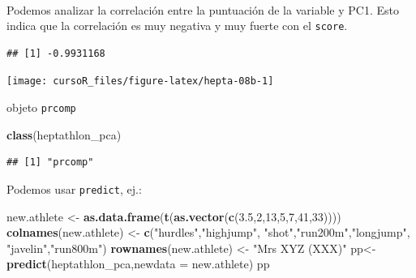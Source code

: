 \documentclass[]{book}
\newenvironment{Shaded}{\begin{snugshade}}{\end{snugshade}}
\newcommand{\KeywordTok}[1]{\textcolor[rgb]{0.13,0.29,0.53}{\textbf{#1}}}
\newcommand{\DataTypeTok}[1]{\textcolor[rgb]{0.13,0.29,0.53}{#1}}
\newcommand{\DecValTok}[1]{\textcolor[rgb]{0.00,0.00,0.81}{#1}}
\newcommand{\FloatTok}[1]{\textcolor[rgb]{0.00,0.00,0.81}{#1}}
\newcommand{\StringTok}[1]{\textcolor[rgb]{0.31,0.60,0.02}{#1}}
\newcommand{\OperatorTok}[1]{\textcolor[rgb]{0.81,0.36,0.00}{\textbf{#1}}}
\newcommand{\NormalTok}[1]{#1}
\begin{document}
~

Podemos analizar la correlación entre la puntuación de la variable y
PC1. Esto indica que la correlación es muy negativa y muy fuerte con el
\texttt{score}.

\begin{Shaded}
\end{Shaded}

\begin{verbatim}
## [1] -0.9931168
\end{verbatim}

\begin{Shaded}
\end{Shaded}

\begin{center}\texttt{[image: cursoR\_files/figure-latex/hepta-08b-1]} \end{center}

objeto \texttt{prcomp}

\begin{Shaded}
\begin{Highlighting}[]
\KeywordTok{class}\NormalTok{(heptathlon_pca)}
\end{Highlighting}
\end{Shaded}

\begin{verbatim}
## [1] "prcomp"
\end{verbatim}

Podemos usar \texttt{predict}, ej.:

\begin{Shaded}
\begin{Highlighting}[]
\NormalTok{new.athlete <-}\StringTok{ }\KeywordTok{as.data.frame}\NormalTok{(}\KeywordTok{t}\NormalTok{(}\KeywordTok{as.vector}\NormalTok{(}\KeywordTok{c}\NormalTok{(}\FloatTok{3.5}\NormalTok{,}\DecValTok{2}\NormalTok{,}\DecValTok{13}\NormalTok{,}\DecValTok{5}\NormalTok{,}\DecValTok{7}\NormalTok{,}\DecValTok{41}\NormalTok{,}\DecValTok{33}\NormalTok{))))}
\KeywordTok{colnames}\NormalTok{(new.athlete) <-}\StringTok{ }\KeywordTok{c}\NormalTok{(}\StringTok{"hurdles"}\NormalTok{,}\StringTok{"highjump"}\NormalTok{,}
                           \StringTok{"shot"}\NormalTok{,}\StringTok{"run200m"}\NormalTok{,}\StringTok{"longjump"}\NormalTok{,}
                           \StringTok{"javelin"}\NormalTok{,}\StringTok{"run800m"}\NormalTok{)}
\KeywordTok{rownames}\NormalTok{(new.athlete) <-}\StringTok{ "Mrs XYZ (XXX)"}
\NormalTok{pp<-}\KeywordTok{predict}\NormalTok{(heptathlon_pca,}\DataTypeTok{newdata =}\NormalTok{ new.athlete)}
\NormalTok{pp}
\end{Highlighting}
\end{Shaded}
\end{document}
